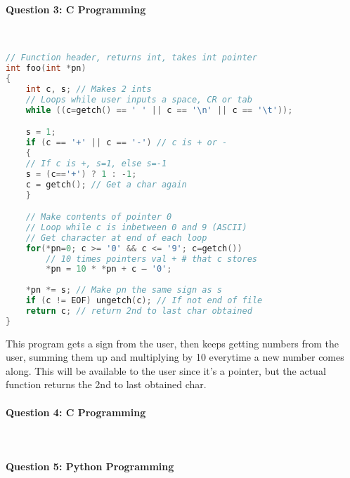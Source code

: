 \documentclass[12 pt]{article}
\begin{document}
\paragraph{Question 3: C Programming}~
\begin{lstlisting}[language=c]
// Function header, returns int, takes int pointer
int foo(int *pn)
{
    int c, s; // Makes 2 ints
    // Loops while user inputs a space, CR or tab
    while ((c=getch() == ' ' || c == '\n' || c == '\t'));

    s = 1; 
    if (c == '+' || c == '-') // c is + or -
    {
    // If c is +, s=1, else s=-1
    s = (c=='+') ? 1 : -1;
    c = getch(); // Get a char again
    }

    // Make contents of pointer 0
    // Loop while c is inbetween 0 and 9 (ASCII)
    // Get character at end of each loop
    for(*pn=0; c >= '0' && c <= '9'; c=getch())
        // 10 times pointers val + # that c stores
        *pn = 10 * *pn + c – '0';
    
    *pn *= s; // Make pn the same sign as s
    if (c != EOF) ungetch(c); // If not end of file
    return c; // return 2nd to last char obtained
}
\end{lstlisting}
This program gets a sign from the user, then keeps getting numbers from the user,
summing them up and multiplying by 10 everytime a new number comes along. This will be available to the user since it's a pointer,
but the actual function returns the 2nd to last obtained char.
\paragraph{Question 4: C Programming}~

\paragraph{Question 5: Python Programming}~

\end{document}
